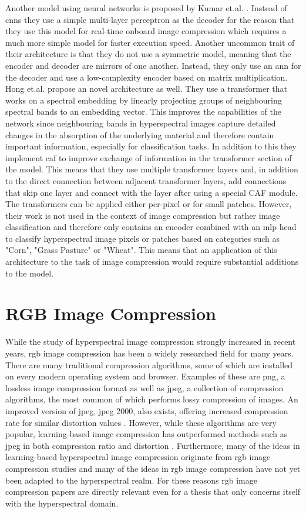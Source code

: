 Another model using neural networks is proposed by Kumar et.al. \citep{leal-taixe_onboard_2019}. Instead of \acp{cnn} they use a simple multi-layer perceptron as the decoder for the reason that they use this model for real-time onboard image compression which requires a much more simple model for faster execution speed. Another uncommon trait of their architecture is that they do not use a symmetric model, meaning that the encoder and decoder are mirrors of one another. Instead, they only use an \ac{ann} for the decoder and use a low-complexity encoder based on matrix multiplication.
Hong et.al. \citep{hong_spectralformer_2022} propose an novel architecture as well. They use a transformer that works on a spectral embedding by linearly projecting groups of neighbouring spectral bands to an embedding vector. This improves the capabilities of the network since neighbouring bands in hyperspectral images capture detailed changes in the absorption of the underlying material and therefore contain important information, especially for classification tasks.
In addition to this they implement \ac{caf} to improve exchange of information in the transformer section of the model. This means that they use multiple transformer layers and, in addition to the direct connection between adjacent transformer layers, add connections that skip one layer and connect with the layer after using a special CAF module.
The transformers can be applied either per-pixel or for small patches. However, their work is not used in the context of image compression but rather image classification and therefore only contains an encoder combined with an \ac{mlp} head to classify hyperspectral image pixels or patches based on categories such as "Corn", "Grass Pasture" or "Wheat". This means that an application of this architecture to the task of image compression would require substantial additions to the model. 
\section{RGB Image Compression \label{sec:ch2rgb}}
While the study of hyperspectral image compression strongly increased in recent years, \ac{rgb} image compression has been a widely researched field for many years. There are many traditional compression algorithms, some of which are installed on every modern operating system and browser. Examples of these are \ac{png}, a lossless image compression format as well as \ac{jpeg}, a collection of compression algorithms, the most common of which performs lossy compression of images. An improved version of \ac{jpeg}, \ac{jpeg} 2000, also exists, offering increased compression rate for similar distortion values \citep{fowler_three-dimensional_2007}.
However, while these algorithms are very popular, learning-based image compression has outperformed methods such as \ac{jpeg} in both compression ratio and distortion \citep{balle_end--end_2017,balle_variational_2018}. Furthermore, many of the ideas in learning-based hyperspectral image compression originate from \ac{rgb} image compression studies and many of the ideas in \ac{rgb} image compression have not yet been adapted to the hyperspectral realm. For these reasons \ac{rgb} image compression papers are directly relevant even for a thesis that only concerns itself with the hyperspectral domain.
